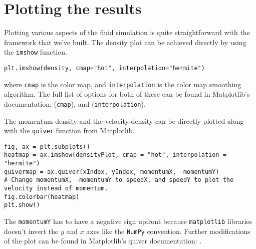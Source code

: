 \section{Plotting the results}

Plotting various aspects of the fluid simulation is quite straightforward with the framework that we've built. The density plot can be achieved directly by using the \texttt{imshow} function. \cite{matplotlib-imshow}
\begin{verbatim}
plt.imshow(density, cmap="hot", interpolation="hermite")
\end{verbatim}
where \texttt{cmap} is the color map, and \texttt{interpolation} is the color map smoothing algorithm. The full list of options for both of these can be found in Matplotlib's documentation: \cite{matplotlib-cmap} (\texttt{cmap}), and \cite{matplotlib-interpolation} (\texttt{interpolation}).

The momentum density and the velocity density can be directly plotted along with the \texttt{quiver} function from Matplotlib. \cite{matplotlib-quiver}
\begin{verbatim}
fig, ax = plt.subplots()
heatmap = ax.imshow(densityPlot, cmap = "hot", interpolation = "hermite")
quivermap = ax.quiver(xIndex, yIndex, momentumX, -momentumY)
# Change momentumX, -momentumY to speedX, and speedY to plot the velocity instead of momentum.
fig.colorbar(heatmap)
plt.show()
\end{verbatim}
The \texttt{momentumY} has to have a negative sign upfront because \texttt{matplotlib} libraries doesn't invert the $y$ and $x$ axes like the \texttt{NumPy} convention. Further modifications of the plot can be found in Matplotlib's quiver documentation: \cite{matplotlib-quiver}.
